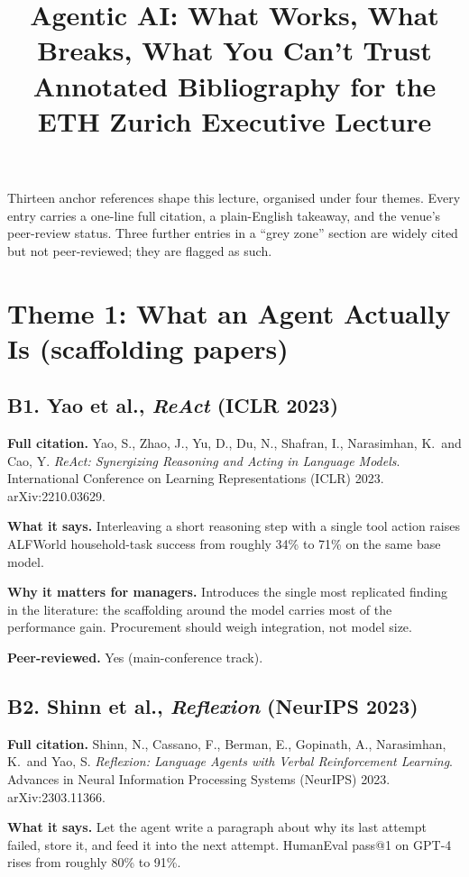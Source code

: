 \documentclass[11pt,a4paper]{article}
\title{Agentic AI: What Works, What Breaks, What You Can't Trust \\[0.2em]
       \large Annotated Bibliography for the ETH Zurich Executive Lecture}
\author{}
\date{}
\begin{document}
\maketitle
\thispagestyle{fancy}

\noindent
Thirteen anchor references shape this lecture, organised under four
themes. Every entry carries a one-line full citation, a plain-English
takeaway, and the venue's peer-review status. Three further entries
in a ``grey zone'' section are widely cited but not peer-reviewed;
they are flagged as such.

\section*{Theme 1: What an Agent Actually Is (scaffolding papers)}

\subsection*{B1. Yao et al., \emph{ReAct} (ICLR 2023)}

\textbf{Full citation.}
Yao, S., Zhao, J., Yu, D., Du, N., Shafran, I., Narasimhan, K.\ and Cao, Y.
\emph{ReAct: Synergizing Reasoning and Acting in Language Models}.
International Conference on Learning Representations (ICLR) 2023.
arXiv:2210.03629.

\textbf{What it says.}
Interleaving a short reasoning step with a single tool action raises
ALFWorld household-task success from roughly 34\% to 71\% on the same
base model.

\textbf{Why it matters for managers.}
Introduces the single most replicated finding in the literature: the
scaffolding around the model carries most of the performance gain.
Procurement should weigh integration, not model size.

\textbf{Peer-reviewed.} Yes (main-conference track).

\subsection*{B2. Shinn et al., \emph{Reflexion} (NeurIPS 2023)}

\textbf{Full citation.}
Shinn, N., Cassano, F., Berman, E., Gopinath, A., Narasimhan, K.\ and Yao, S.
\emph{Reflexion: Language Agents with Verbal Reinforcement Learning}.
Advances in Neural Information Processing Systems (NeurIPS) 2023.
arXiv:2303.11366.

\textbf{What it says.}
Let the agent write a paragraph about why its last attempt failed,
store it, and feed it into the next attempt. HumanEval pass@1 on GPT-4
rises from roughly 80\% to 91\%.
\end{document}

